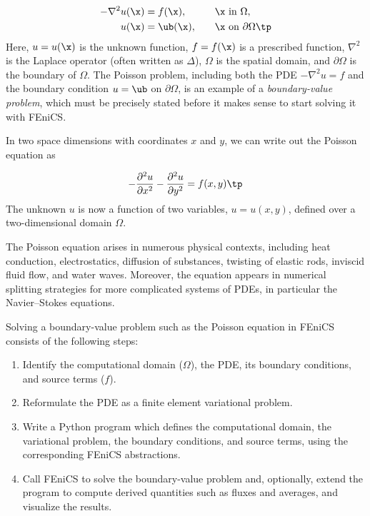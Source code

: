 \documentclass[graybox,envcountchap,sectrefs,final]{svmonodo}
\begin{document}
\begin{alignat}{2}
- \nabla^2 u(\x) &= f(\x),\quad &&\x\mbox{ in } \Omega,
\label{ftut:poisson1}\\
u(\x) &= \ub(\x),\quad &&\x\mbox{ on } \partial \Omega\tp \label{ch:poisson0:bc}
\end{alignat}
Here, $u = u(\x)$ is the unknown function, $f = f(\x)$ is a
prescribed function, $\nabla^2$ is the Laplace operator
(often written as $\Delta$), $\Omega$ is the spatial domain, and
$\partial\Omega$ is the boundary of $\Omega$. The Poisson problem,
including both the PDE $-\nabla^2 u = f$ and the boundary condition
$u = \ub$ on $\partial \Omega$, is an example of a \emph{boundary-value
problem}, which must be precisely stated before
it makes sense to start solving it with FEniCS.

In two space dimensions with coordinates $x$ and $y$, we can write out
the Poisson equation as

\begin{equation}
- {\partial^2 u\over\partial x^2} -
{\partial^2 u\over\partial y^2} = f(x,y)\tp
\end{equation}
The unknown $u$ is now a function of two variables, $u = u(x,y)$, defined
over a two-dimensional domain $\Omega$.

The Poisson equation arises in numerous physical contexts, including
heat conduction, electrostatics, diffusion of substances, twisting of
elastic rods, inviscid fluid flow, and water waves. Moreover, the
equation appears in numerical splitting strategies for more complicated
systems of PDEs, in particular the Navier--Stokes equations.

Solving a boundary-value problem such as the Poisson equation in
FEniCS consists of the following steps:

\begin{enumerate}
 \item Identify the computational domain ($\Omega$), the PDE, its
    boundary conditions, and source terms ($f$).

 \item Reformulate the PDE as a finite element variational problem.

 \item Write a Python program which defines the computational domain,
    the variational problem, the boundary conditions, and source
    terms, using the corresponding FEniCS abstractions.

 \item Call FEniCS to solve the boundary-value problem and, optionally,
    extend the program
    to compute derived quantities such as fluxes and averages, and
    visualize the results.
\end{enumerate}
\end{document}
